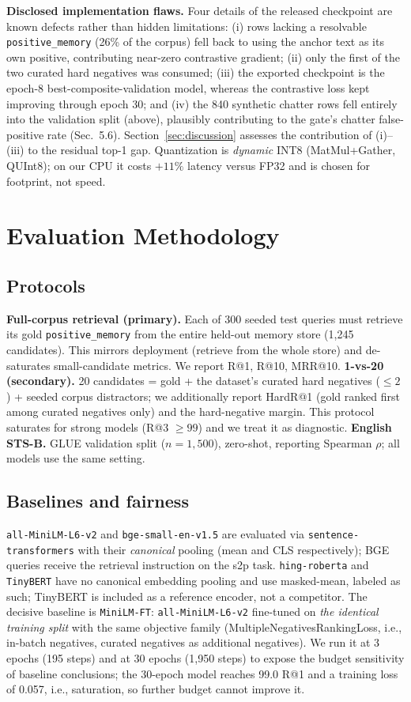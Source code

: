 \documentclass[11pt]{article}
\begin{document}
\textbf{Disclosed implementation flaws.} Four details of the released checkpoint are known defects rather than hidden limitations: (i) rows lacking a resolvable \texttt{positive\_memory} (26\% of the corpus) fell back to using the anchor text as its own positive, contributing near-zero contrastive gradient; (ii) only the first of the two curated hard negatives was consumed; (iii) the exported checkpoint is the epoch-8 best-composite-validation model, whereas the contrastive loss kept improving through epoch 30; and (iv) the 840 synthetic chatter rows fell entirely into the validation split (above), plausibly contributing to the gate's chatter false-positive rate (Sec.~5.6). Section~\ref{sec:discussion} assesses the contribution of (i)--(iii) to the residual top-1 gap. Quantization is \emph{dynamic} INT8 (MatMul+Gather, QUInt8); on our CPU it costs $+11\%$ latency versus FP32 and is chosen for footprint, not speed.

\section{Evaluation Methodology}
\subsection{Protocols}
\textbf{Full-corpus retrieval (primary).} Each of 300 seeded test queries must retrieve its gold \texttt{positive\_memory} from the entire held-out memory store (1{,}245 candidates). This mirrors deployment (retrieve from the whole store) and de-saturates small-candidate metrics. We report R@1, R@10, MRR@10.
\textbf{1-vs-20 (secondary).} 20 candidates = gold + the dataset's curated hard negatives ($\le 2$) + seeded corpus distractors; we additionally report HardR@1 (gold ranked first among curated negatives only) and the hard-negative margin. This protocol saturates for strong models (R@3 $\ge 99$) and we treat it as diagnostic.
\textbf{English STS-B.} GLUE \cite{wang2018glue} validation split ($n{=}1{,}500$), zero-shot, reporting Spearman $\rho$; all models use the same setting.

\subsection{Baselines and fairness}
\texttt{all-MiniLM-L6-v2} and \texttt{bge-small-en-v1.5} are evaluated via \texttt{sentence-transformers} with their \emph{canonical} pooling (mean and CLS respectively); BGE queries receive the retrieval instruction on the s2p task. \texttt{hing-roberta} and \texttt{TinyBERT} have no canonical embedding pooling and use masked-mean, labeled as such; TinyBERT is included as a reference encoder, not a competitor. The decisive baseline is \texttt{MiniLM-FT}: \texttt{all-MiniLM-L6-v2} fine-tuned on \emph{the identical training split} with the same objective family (MultipleNegativesRankingLoss, i.e., in-batch negatives, curated negatives as additional negatives). We run it at 3 epochs (195 steps) and at 30 epochs (1{,}950 steps) to expose the budget sensitivity of baseline conclusions; the 30-epoch model reaches 99.0 R@1 and a training loss of 0.057, i.e., saturation, so further budget cannot improve it.
\end{document}
